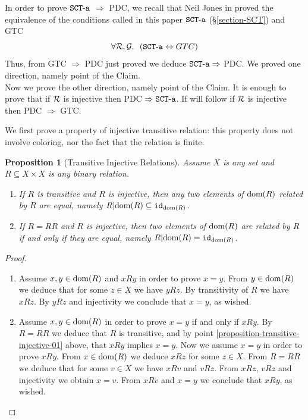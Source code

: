 \documentclass{lmcs}
\newtheorem{proposition}[theorem]{Proposition}
\begin{document}
In order to prove ${\tt SCT\mbox{-}a}$ $\Rightarrow$ PDC, we recall 
that Neil Jones in \cite{Lee1} 
proved the equivalence of the conditions called in this paper 
${\tt SCT\mbox{-}a}$ (\S \ref{section-SCT}) and GTC
$$
\forall \setR, \setG.  \ \ 
(\SCTa \Leftrightarrow GTC)
$$
Thus, from GTC $\Rightarrow$ PDC just proved we deduce ${\tt SCT\mbox{-}a} \Rightarrow$ PDC. 
We proved one direction, namely point \label{property-2} of the Claim.
\\

Now we prove the other direction, namely point \label{property-1} of the Claim.
It is enough to prove that if ${\mathcal R}$ is injective then PDC $\Rightarrow {\tt SCT\mbox{-}a}$. If will follow
if ${\mathcal R}$ is injective then PDC $\Rightarrow$ GTC. 

We first prove a property of injective transitive relation: this property does not
involve coloring, nor the fact that the relation is finite.

\begin{proposition}[Transitive Injective Relations]
\label{proposition-transitive-injective}
Assume $X$ is any set and $R \subseteq X \times X$ is any binary relation.
\begin{enumerate}
\item
\label{proposition-transitive-injective-01}
If $R$ is transitive and $R$ is injective, then any two elements of ${\rm dom}(R)$ related by $R$ 
are equal, namely $R {|} {\rm dom}(R) \subseteq {\tt id}_{{\rm dom}(R)}$.
\item
\label{proposition-transitive-injective-02}
If $R=RR$ and $R$ is injective, then two elements of ${\rm dom}(R)$ are related by $R$ 
\emph{if and only if} they are equal, namely $R {|} {\rm dom}(R) = {\tt id}_{{\rm dom}(R)}$.
\end{enumerate}
\end{proposition} 

\begin{proof}
\begin{enumerate}
\item
Assume $x, y \in {\rm dom}(R)$ and $x R y$ in order to prove $x = y$. 
From $y \in {\rm dom}(R)$ we deduce that for some
$z \in X$ we have $y R z$. By transitivity of $R$ we have $x R z$. By $y R z$ and injectivity
we conclude that $x = y$, as wished.

\item
Assume $x, y \in {\rm dom}(R)$ in order to prove $x = y$ if and only if $x R y$. By $R=RR$
we deduce that $R$ is transitive, and by point \ref{proposition-transitive-injective-01} above,
that $x R y$ implies $x=y$. Now we assume $x=y$ in order to prove $x R y$. 
From $x \in {\rm dom}(R)$ we deduce $x R z$ for some $z \in X$. From $R =RR$ we deduce
that for some $v \in X$ we have $x R v$ and $v R z$. From $x R z$, $v R z$ and injectivity
we obtain $x = v$. From $x R v$ and $x = y$ we conclude that $x R y$,
as wished.
\end{enumerate}
\end{proof}
\end{document}

